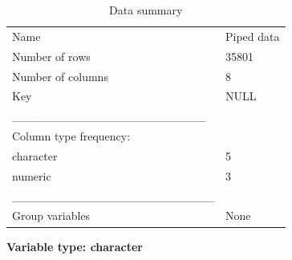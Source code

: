 \documentclass[
  letterpaper,
  DIV=11,
  numbers=noendperiod]{scrreprt}
\begin{document}
\begin{longtable}[]{@{}ll@{}}
\caption{Data summary}\tabularnewline
\toprule()
\endhead
Name & Piped data \\
Number of rows & 35801 \\
Number of columns & 8 \\
Key & NULL \\
\_\_\_\_\_\_\_\_\_\_\_\_\_\_\_\_\_\_\_\_\_\_\_ & \\
Column type frequency: & \\
character & 5 \\
numeric & 3 \\
\_\_\_\_\_\_\_\_\_\_\_\_\_\_\_\_\_\_\_\_\_\_\_\_ & \\
Group variables & None \\
\bottomrule()
\end{longtable}

\textbf{Variable type: character}
\end{document}
